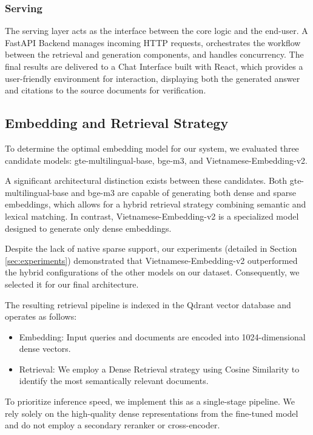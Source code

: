 \documentclass[letterpaper]{article} %
\begin{document}
\subsubsection{Serving}
The serving layer acts as the interface between the core logic and the end-user. A FastAPI Backend manages incoming HTTP requests, orchestrates the workflow between the retrieval and generation components, and handles concurrency. The final results are delivered to a Chat Interface built with React, which provides a user-friendly environment for interaction, displaying both the generated answer and citations to the source documents for verification.

\subsection{Embedding and Retrieval Strategy}

To determine the optimal embedding model for our system, we evaluated three candidate models: gte-multilingual-base, bge-m3, and Vietnamese-Embedding-v2.

A significant architectural distinction exists between these candidates. Both gte-multilingual-base and bge-m3 are capable of generating both dense and sparse embeddings, which allows for a hybrid retrieval strategy combining semantic and lexical matching. In contrast, Vietnamese-Embedding-v2 is a specialized model designed to generate only dense embeddings.

Despite the lack of native sparse support, our experiments (detailed in Section \ref{sec:experiments}) demonstrated that Vietnamese-Embedding-v2 outperformed the hybrid configurations of the other models on our dataset. Consequently, we selected it for our final architecture.

The resulting retrieval pipeline is indexed in the Qdrant vector database and operates as follows:

\begin{itemize}
    \item Embedding: Input queries and documents are encoded into 1024-dimensional dense vectors.
    \item Retrieval: We employ a Dense Retrieval strategy using Cosine Similarity to identify the most semantically relevant documents.
\end{itemize}

To prioritize inference speed, we implement this as a single-stage pipeline. We rely solely on the high-quality dense representations from the fine-tuned model and do not employ a secondary reranker or cross-encoder.
\end{document}
